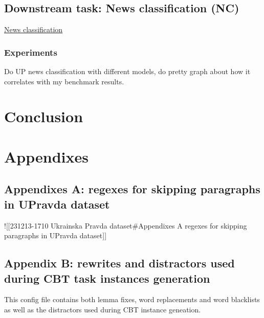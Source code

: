 \section{Downstream task: News classification
(NC)}\label{downstream-task-news-classification-nc}

\href{https://github.com/fido-ai/ua-datasets/tree/main/ua_datasets/src/text_classification}{News
classification}

\subsection{Experiments}\label{experiments-1}

Do UP news classification with different models, do pretty graph about
how it correlates with my benchmark results.

\chapter{Conclusion}\label{conclusion}

\chapter{Appendixes}\label{appendixes}

\section{Appendixes A: regexes for skipping paragraphs in UPravda
dataset}\label{appendixes-a-regexes-for-skipping-paragraphs-in-upravda-dataset}

!{[}{[}231213-1710 Ukrainska Pravda dataset\#Appendixes A regexes for
skipping paragraphs in UPravda dataset{]}{]}

\section{Appendix B: rewrites and distractors used during CBT task
instances
generation}\label{appendix-b-rewrites-and-distractors-used-during-cbt-task-instances-generation}

This config file contains both lemma fixes, word replacements and word
blacklists as well as the distractors used during CBT instance
geneation.